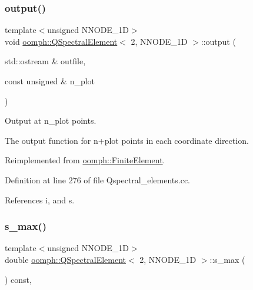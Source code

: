 \subsubsection{\texorpdfstring{output()}{output()}\hspace{0.1cm}{\footnotesize\ttfamily [4/4]}}
{\footnotesize\ttfamily template$<$unsigned N\+N\+O\+D\+E\+\_\+1D$>$ \\
void \hyperlink{classoomph_1_1QSpectralElement}{oomph\+::\+Q\+Spectral\+Element}$<$ 2, N\+N\+O\+D\+E\+\_\+1D $>$\+::output (\begin{DoxyParamCaption}\item[{std\+::ostream \&}]{outfile,  }\item[{const unsigned \&}]{n\+\_\+plot }\end{DoxyParamCaption})\hspace{0.3cm}{\ttfamily [virtual]}}



Output at n\+\_\+plot points. 

The output function for n+plot points in each coordinate direction. 

Reimplemented from \hyperlink{classoomph_1_1FiniteElement_afa9d9b2670f999b43e6679c9dd28c457}{oomph\+::\+Finite\+Element}.



Definition at line 276 of file Qspectral\+\_\+elements.\+cc.



References i, and s.

\mbox{\label{classoomph_1_1QSpectralElement_3_012_00_01NNODE__1D_01_4_acd8cca2ab3f58003675a6dc147217a7d}} 
\subsubsection{\texorpdfstring{s\+\_\+max()}{s\_max()}}
{\footnotesize\ttfamily template$<$unsigned N\+N\+O\+D\+E\+\_\+1D$>$ \\
double \hyperlink{classoomph_1_1QSpectralElement}{oomph\+::\+Q\+Spectral\+Element}$<$ 2, N\+N\+O\+D\+E\+\_\+1D $>$\+::s\+\_\+max (\begin{DoxyParamCaption}{ }\end{DoxyParamCaption}) const\hspace{0.3cm}{\ttfamily [inline]}, {\ttfamily [virtual]}}



